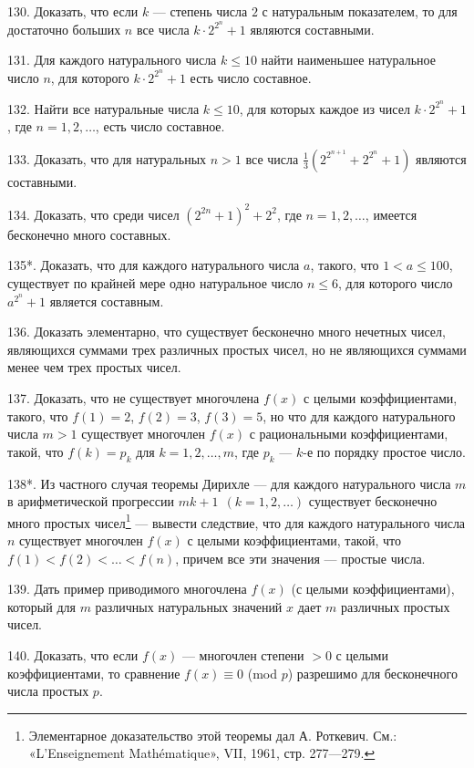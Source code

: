 \documentclass[12pt, a4paper, openany]{book}
\begin{document}
130. Доказать, что если $k$ — степень числа $2$ с натуральным показателем, то для достаточно больших $n$ все числа $\displaystyle k \cdot 2^{2^n}+1$ являются составными.

131. Для каждого натурального числа $k \leq 10$ найти наименьшее натуральное число $n$, для которого $\displaystyle k \cdot 2^{2^n}+1$ есть число составное.

132. Найти все натуральные числа $k \leq 10$, для которых каждое из чисел $\displaystyle k \cdot 2^{2^n}+1$, где $n=1, 2, \dots$, есть число составное.

133. Доказать, что для натуральных $n>1$ все числа $\displaystyle \frac{1}{3}(2^{2^{n+1}}+2^{2^{n}}+1)$ являются составными.

134. Доказать, что среди чисел $(2^{2n}+1)^2 + 2^2$, где $n=1, 2, \dots$, имеется бесконечно много составных.

135*. Доказать, что для каждого натурального числа $a$, такого, что $1 < a \leq 100$, существует по крайней мере одно натуральное число $n \leq 6$, для которого число $a^{2^n}+1$ является составным.

136. Доказать элементарно, что существует бесконечно много нечетных чисел, являющихся суммами трех различных простых чисел, но не являющихся суммами менее чем трех простых чисел.

137. Доказать, что не существует многочлена $f(x)$ с целыми коэффициентами, такого, что $f(1)=2$, $f(2)=3$, $f(3)=5$, но что для каждого натурального числа $m>1$ существует многочлен $f(x)$ с рациональными коэффициентами, такой, что $f(k)=p_k$ для $k=1,2,\dots, m$, где $p_k$ --- $k$-е по порядку простое число.

138*. Из частного случая теоремы Дирихле — для каждого натурального числа $m$ в арифметической прогрессии $mk+1 \ \ (k=1,2,\dots)$ существует бесконечно много простых чисел{\footnote{Элементарное доказательство этой теоремы дал А. Роткевич. См.: «L'Enseignement Mathématique», VII, 1961, стр. 277—279.}} — вывести следствие, что для каждого натурального числа $n$ существует многочлен $f(x)$ с целыми коэффициентами, такой, что $f(1)<f(2)<\dots<f(n)$, причем все эти значения — простые числа.

139. Дать пример приводимого многочлена $f(x)$ (с целыми коэффициентами), который для $m$ различных натуральных значений $x$ дает $m$ различных простых чисел.

140. Доказать, что если $f(x)$ — многочлен степени $>0$ с целыми коэффициентами, то сравнение $f(x) \equiv 0 $ (mod $p$) разрешимо для бесконечного числа простых $p$.
\end{document}
